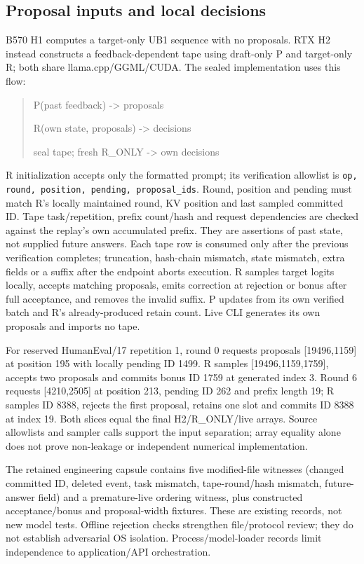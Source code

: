 \subsection{Proposal inputs and local decisions}
\label{app:h2audit}
B570 H1 computes a target-only UB1 sequence with no proposals. RTX H2 instead constructs a feedback-dependent tape using draft-only P and target-only R; both share llama.cpp/GGML/CUDA. The sealed implementation uses this flow:
\begin{quote}\ttfamily
P(past feedback) -> proposals\par
R(own state, proposals) -> decisions\par
seal tape; fresh R\_ONLY -> own decisions
\end{quote}
R initialization accepts only the formatted prompt; its verification allowlist is \texttt{op, round, position, pending, proposal\_ids}. Round, position and pending must match R's locally maintained round, KV position and last sampled committed ID. Tape task/repetition, prefix count/hash and request dependencies are checked against the replay's own accumulated prefix. They are assertions of past state, not supplied future answers. Each tape row is consumed only after the previous verification completes; truncation, hash-chain mismatch, state mismatch, extra fields or a suffix after the endpoint aborts execution. R samples target logits locally, accepts matching proposals, emits correction at rejection or bonus after full acceptance, and removes the invalid suffix. P updates from its own verified batch and R's already-produced retain count. Live CLI generates its own proposals and imports no tape.

For reserved HumanEval/17 repetition 1, round 0 requests proposals [19496,1159] at position 195 with locally pending ID 1499. R samples [19496,1159,1759], accepts two proposals and commits bonus ID 1759 at generated index 3. Round 6 requests [4210,2505] at position 213, pending ID 262 and prefix length 19; R samples ID 8388, rejects the first proposal, retains one slot and commits ID 8388 at index 19. Both slices equal the final H2/R\_ONLY/live arrays. Source allowlists and sampler calls support the input separation; array equality alone does not prove non-leakage or independent numerical implementation.

The retained engineering capsule contains five modified-file witnesses (changed committed ID, deleted event, task mismatch, tape-round/hash mismatch, future-answer field) and a premature-live ordering witness, plus constructed acceptance/bonus and proposal-width fixtures. These are existing records, not new model tests. Offline rejection checks strengthen file/protocol review; they do not establish adversarial OS isolation. Process/model-loader records limit independence to application/API orchestration.


